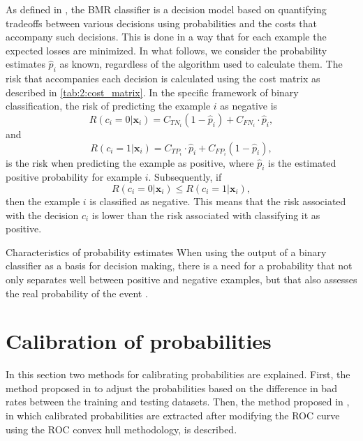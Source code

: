 As defined in \citep{Ghosh2006}, the BMR classifier is a decision model based on
quantifying tradeoffs between various decisions using probabilities and the costs that accompany 
such decisions. This is done in a way that for each example the expected losses are minimized. In  
what follows, we consider the probability estimates $\hat p_i$ as known, regardless of the algorithm 
used to calculate them.  The risk that accompanies each decision is calculated using the cost matrix 
as described in \tablename{ \ref{tab:2:cost_matrix}}. In the specific framework of binary 
classification, the risk of predicting the example $i$ as negative is 
\begin{equation}
  R(c_i=0|\mathbf{x}_i)=C_{TN_i}(1-\hat p_i)+C_{FN_i} \cdot \hat p_i, 
\end{equation}
and
\begin{equation}
  R(c_i=1|\mathbf{x}_i)=C_{TP_i} \cdot \hat p_i + C_{FP_i}(1- \hat p_i), 
\end{equation}
is the risk when predicting the example as positive, where $\hat p_i$ is the estimated positive 
probability for example $i$. Subsequently, if 
\begin{equation}
  R(c_i=0|\mathbf{x}_i) \le R(c_i=1|\mathbf{x}_i), 
\end{equation}
then  the example $i$ is classified as negative. This means that the risk associated with the 
decision $c_i$ is lower than the risk associated with classifying it as positive. 

\begin{remark}{Characteristics of probability estimates}
When using the output of a binary classifier as a basis for decision making, there is a 
need for a probability that not only separates well between positive and negative examples, but that 
also assesses the real probability of the event \citep{cohen2004}.
\end{remark}


\section{Calibration of probabilities}
\label{sec:4:prob}

In this section two methods for calibrating probabilities are explained. First, the method proposed 
in \citep{Elkan2001} to adjust the probabilities based on the   difference in bad rates  between the 
training and testing datasets.  Then, the method proposed in \cite{Hernandez-Orallo2012}, in which 
calibrated probabilities are extracted after modifying the ROC curve using the ROC convex hull 
methodology, is described.
  

